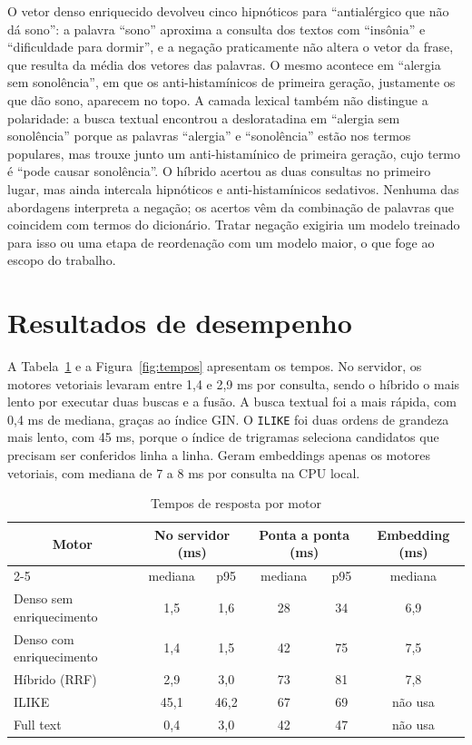 \documentclass[12pt,oneside,a4paper,english,brazil]{abntex2}
\newcommand{\campo}[1]{\texttt{#1}}
\begin{document}
O vetor denso enriquecido devolveu cinco hipnóticos para ``antialérgico que não dá sono'': a palavra ``sono'' aproxima a consulta dos textos com ``insônia'' e ``dificuldade para dormir'', e a negação praticamente não altera o vetor da frase, que resulta da média dos vetores das palavras. O mesmo acontece em ``alergia sem sonolência'', em que os anti-histamínicos de primeira geração, justamente os que dão sono, aparecem no topo. A camada lexical também não distingue a polaridade: a busca textual encontrou a desloratadina em ``alergia sem sonolência'' porque as palavras ``alergia'' e ``sonolência'' estão nos termos populares, mas trouxe junto um anti-histamínico de primeira geração, cujo termo é ``pode causar sonolência''. O híbrido acertou as duas consultas no primeiro lugar, mas ainda intercala hipnóticos e anti-histamínicos sedativos. Nenhuma das abordagens interpreta a negação; os acertos vêm da combinação de palavras que coincidem com termos do dicionário. Tratar negação exigiria um modelo treinado para isso ou uma etapa de reordenação com um modelo maior, o que foge ao escopo do trabalho.

\section{Resultados de desempenho}

A Tabela~\ref{tab:tempos} e a Figura~\ref{fig:tempos} apresentam os tempos. No servidor, os motores vetoriais levaram entre 1,4 e 2,9 ms por consulta, sendo o híbrido o mais lento por executar duas buscas e a fusão. A busca textual foi a mais rápida, com 0,4 ms de mediana, graças ao índice GIN. O \campo{ILIKE} foi duas ordens de grandeza mais lento, com 45 ms, porque o índice de trigramas seleciona candidatos que precisam ser conferidos linha a linha. Geram embeddings apenas os motores vetoriais, com mediana de 7 a 8 ms por consulta na CPU local.

\begin{table}[htb]
  \centering
  \caption{Tempos de resposta por motor}
  \label{tab:tempos}
  \footnotesize
  \begin{tabular}{|l|c|c|c|c|c|}
    \hline
    \multicolumn{1}{|c|}{\textbf{Motor}} & \multicolumn{2}{c|}{\textbf{No servidor (ms)}} & \multicolumn{2}{c|}{\textbf{Ponta a ponta (ms)}} & \textbf{Embedding (ms)} \\ \cline{2-5}
    & mediana & p95 & mediana & p95 & mediana \\ \hline
    Denso sem enriquecimento & 1,5 & 1,6 & 28 & 34 & 6,9 \\ \hline
    Denso com enriquecimento & 1,4 & 1,5 & 42 & 75 & 7,5 \\ \hline
    Híbrido (RRF) & 2,9 & 3,0 & 73 & 81 & 7,8 \\ \hline
    ILIKE & 45,1 & 46,2 & 67 & 69 & não usa \\ \hline
    Full text & 0,4 & 3,0 & 42 & 47 & não usa \\ \hline
  \end{tabular}
\end{table}
\end{document}
